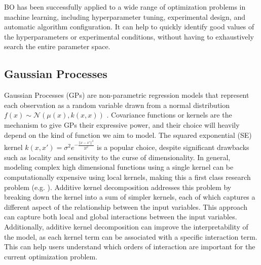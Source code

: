 \documentclass{IOS-Book-Article}
\begin{document}
	BO has been successfully applied to a wide range of optimization problems in machine learning, including hyperparameter tuning, experimental design, and automatic algorithm configuration. It can help to quickly identify good values of the hyperparameters or experimental conditions, without having to exhaustively search the entire parameter space.
	
	\subsection{Gaussian Processes}
	Gaussian Processes (GPs) are non-parametric regression models that represent each observation as a random variable drawn from a normal distribution $f(x) \sim \mathcal{N}(\mu(x), k(x,x))$ \cite{gaussian-processes}. Covariance functions or kernels are the mechanism to give GPs their expressive power, and their choice will heavily depend on the kind of function we aim to model\cite{kernel-composition}. The squared exponential (SE) kernel $k(x,x') = \sigma^2 e^{-\frac{||x-x'||^2}{2l^2}}$ is a popular choice, despite significant drawbacks such as locality and sensitivity to the curse of dimensionality\cite{curse-dimensionality}.
	In general, modeling complex high dimensional functions using a single kernel can be computationally expensive using local kernels, making this a first class research problem (e.g. \cite{gp-high-dim}\cite{gp-high-dim2}).
	Additive kernel decomposition\cite{gp-additive} addresses this problem by breaking down the kernel into a sum of simpler kernels, each of which captures a different aspect of the relationship between the input variables. This approach can capture both local and global interactions between the input variables. Additionally, additive kernel decomposition can improve the interpretability of the model, as each kernel term can be associated with a specific interaction term. This can help users understand which orders of interaction are important for the current optimization problem. 
		
\end{document}
